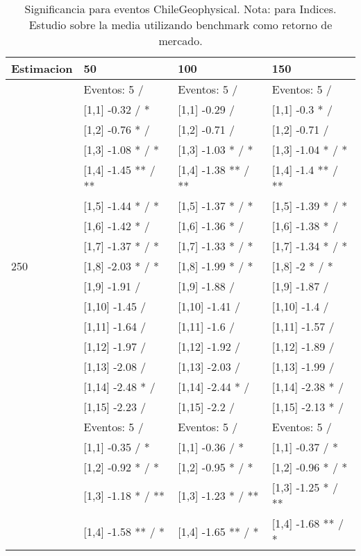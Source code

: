 \begin{table}

\caption{Significancia para eventos ChileGeophysical. Nota: para Indices. Estudio sobre la media utilizando benchmark como retorno de mercado.}
\centering
\begin{tabular}[t]{llll}
\toprule
Estimacion & 50 & 100 & 150\\
\midrule
 & Eventos:  5 / & Eventos:  5 / & Eventos:  5 /\\
 & {}[1,1] -0.32  / * & {}[1,1] -0.29  / & {}[1,1] -0.3 * /\\
 & {}[1,2] -0.76 * / & {}[1,2] -0.71  / & {}[1,2] -0.71  /\\
 & {}[1,3] -1.08 * / * & {}[1,3] -1.03 * / * & {}[1,3] -1.04 * / *\\
 & {}[1,4] -1.45 ** / ** & {}[1,4] -1.38 ** / ** & {}[1,4] -1.4 ** / **\\
\addlinespace
 & {}[1,5] -1.44 * / * & {}[1,5] -1.37 * / * & {}[1,5] -1.39 * / *\\
 & {}[1,6] -1.42 * / & {}[1,6] -1.36 * / & {}[1,6] -1.38 * /\\
 & {}[1,7] -1.37 * / * & {}[1,7] -1.33 * / * & {}[1,7] -1.34 * / *\\
250 & {}[1,8] -2.03 * / * & {}[1,8] -1.99 * / * & {}[1,8] -2 * / *\\
 & {}[1,9] -1.91  / & {}[1,9] -1.88  / & {}[1,9] -1.87  /\\
\addlinespace
 & {}[1,10] -1.45  / & {}[1,10] -1.41  / & {}[1,10] -1.4  /\\
 & {}[1,11] -1.64  / & {}[1,11] -1.6  / & {}[1,11] -1.57  /\\
 & {}[1,12] -1.97  / & {}[1,12] -1.92  / & {}[1,12] -1.89  /\\
 & {}[1,13] -2.08  / & {}[1,13] -2.03  / & {}[1,13] -1.99  /\\
 & {}[1,14] -2.48 * / & {}[1,14] -2.44 * / & {}[1,14] -2.38 * /\\
\addlinespace
 & {}[1,15] -2.23  / & {}[1,15] -2.2  / & {}[1,15] -2.13 * /\\
 & Eventos:  5 / & Eventos:  5 / & Eventos:  5 /\\
 & {}[1,1] -0.35  / * & {}[1,1] -0.36  / * & {}[1,1] -0.37  / *\\
 & {}[1,2] -0.92 * / * & {}[1,2] -0.95 * / * & {}[1,2] -0.96 * / *\\
 & {}[1,3] -1.18 * / ** & {}[1,3] -1.23 * / ** & {}[1,3] -1.25 * / **\\
\addlinespace
 & {}[1,4] -1.58 ** / * & {}[1,4] -1.65 ** / * & {}[1,4] -1.68 ** / *\\

\end{tabular}
\end{table}
